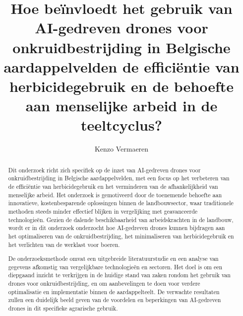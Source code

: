 \documentclass{hogent-article}
\title{Hoe beïnvloedt het gebruik van AI-gedreven drones voor onkruidbestrijding in Belgische aardappelvelden de efficiëntie van herbicidegebruik en de behoefte aan menselijke arbeid in de teeltcyclus?}
\author{ Kenzo Vermaeren}
\begin{document}
\begin{abstract}
 Dit onderzoek richt zich specifiek op de inzet van AI-gedreven drones voor onkruidbestrijding in Belgische aardappelvelden, met een focus op het verbeteren van de efficiëntie van herbicidegebruik en het verminderen van de afhankelijkheid van menselijke arbeid. Het onderzoek is gemotiveerd door de toenemende behoefte aan innovatieve, kostenbesparende oplossingen binnen de landbouwsector, waar traditionele methoden steeds minder effectief blijken in vergelijking met geavanceerde technologieën. Gezien de dalende beschikbaarheid van arbeidskrachten in de landbouw, wordt er in dit onderzoek onderzocht hoe AI-gedreven drones kunnen bijdragen aan het optimaliseren van de onkruidbestrijding, het minimaliseren van herbicidegebruik en het verlichten van de werklast voor boeren.

De onderzoeksmethode omvat een uitgebreide literatuurstudie en een analyse van gegevens afkomstig van vergelijkbare technologieën en sectoren. Het doel is om een diepgaand inzicht te verkrijgen in de huidige stand van zaken rondom het gebruik van drones voor onkruidbestrijding, en om aanbevelingen te doen voor verdere optimalisatie en implementatie binnen de aardappelteelt. De verwachte resultaten zullen een duidelijk beeld geven van de voordelen en beperkingen van AI-gedreven drones in dit specifieke agrarische gebruik.

\end{abstract}

\tableofcontents

\bigskip

%
%
%

% 
%
%
%
\end{document}
